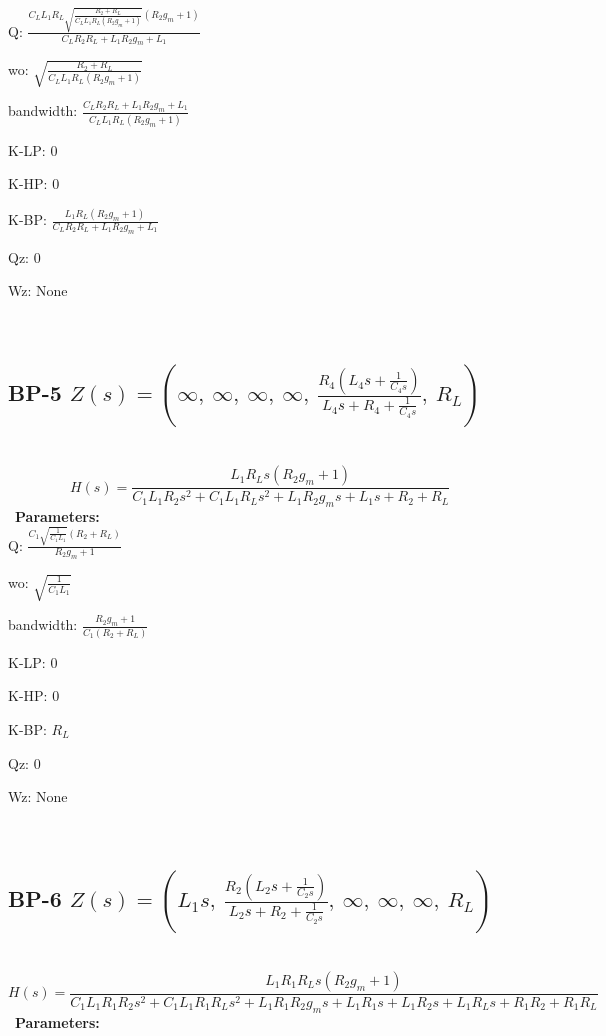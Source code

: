 \documentclass{article}
\begin{document}
Q: $\frac{C_{L} L_{1} R_{L} \sqrt{\frac{R_{2} + R_{L}}{C_{L} L_{1} R_{L} \left(R_{2} g_{m} + 1\right)}} \left(R_{2} g_{m} + 1\right)}{C_{L} R_{2} R_{L} + L_{1} R_{2} g_{m} + L_{1}}$\ 

wo: $\sqrt{\frac{R_{2} + R_{L}}{C_{L} L_{1} R_{L} \left(R_{2} g_{m} + 1\right)}}$\ 

bandwidth: $\frac{C_{L} R_{2} R_{L} + L_{1} R_{2} g_{m} + L_{1}}{C_{L} L_{1} R_{L} \left(R_{2} g_{m} + 1\right)}$\ 

K-LP: $0$\ 

K-HP: $0$\ 

K-BP: $\frac{L_{1} R_{L} \left(R_{2} g_{m} + 1\right)}{C_{L} R_{2} R_{L} + L_{1} R_{2} g_{m} + L_{1}}$\ 

Qz: $0$\ 

Wz: $\text{None}$\ 

\ 

\subsection{BP-5 $Z(s) = \left( \infty, \  \infty, \  \infty, \  \infty, \  \frac{R_{4} \left(L_{4} s + \frac{1}{C_{4} s}\right)}{L_{4} s + R_{4} + \frac{1}{C_{4} s}}, \  R_{L}\right)$ } \ 
\textbf{\[H(s) = \frac{L_{1} R_{L} s \left(R_{2} g_{m} + 1\right)}{C_{1} L_{1} R_{2} s^{2} + C_{1} L_{1} R_{L} s^{2} + L_{1} R_{2} g_{m} s + L_{1} s + R_{2} + R_{L}}\] } \ 
\textbf{Parameters:}\\ 

Q: $\frac{C_{1} \sqrt{\frac{1}{C_{1} L_{1}}} \left(R_{2} + R_{L}\right)}{R_{2} g_{m} + 1}$\ 

wo: $\sqrt{\frac{1}{C_{1} L_{1}}}$\ 

bandwidth: $\frac{R_{2} g_{m} + 1}{C_{1} \left(R_{2} + R_{L}\right)}$\ 

K-LP: $0$\ 

K-HP: $0$\ 

K-BP: $R_{L}$\ 

Qz: $0$\ 

Wz: $\text{None}$\ 

\ 

\subsection{BP-6 $Z(s) = \left( L_{1} s, \  \frac{R_{2} \left(L_{2} s + \frac{1}{C_{2} s}\right)}{L_{2} s + R_{2} + \frac{1}{C_{2} s}}, \  \infty, \  \infty, \  \infty, \  R_{L}\right)$ } \ 
\textbf{\[H(s) = \frac{L_{1} R_{1} R_{L} s \left(R_{2} g_{m} + 1\right)}{C_{1} L_{1} R_{1} R_{2} s^{2} + C_{1} L_{1} R_{1} R_{L} s^{2} + L_{1} R_{1} R_{2} g_{m} s + L_{1} R_{1} s + L_{1} R_{2} s + L_{1} R_{L} s + R_{1} R_{2} + R_{1} R_{L}}\] } \ 
\textbf{Parameters:}\\ 
\end{document}
